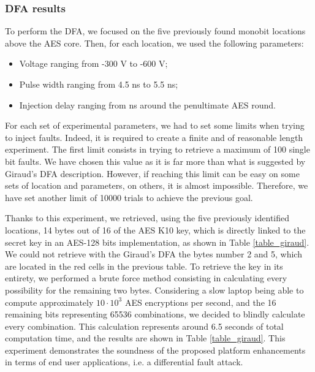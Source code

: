 		\subsubsection{DFA results}
			To perform the DFA, we focused on the five previously found monobit locations above the AES core.
			Then, for each location, we used the following parameters:
			\begin{itemize}
				\item Voltage ranging from -300 V to -600 V;
				\item Pulse width ranging from 4.5 ns to 5.5 ns;
				\item Injection delay ranging from  ns around the penultimate AES round.
			\end{itemize}
			For each set of experimental parameters, we had to set some limits when trying to inject faults.
			Indeed, it is required to create a finite and of reasonable length experiment.
			The first limit consists in trying to retrieve a maximum of 100 single bit faults.
			We have chosen this value as it is far more than what is suggested by Giraud's DFA \cite{giraudDfa} description.
			However, if reaching this limit can be easy on some sets of location and parameters, on others, it is almost impossible.
			Therefore, we have set another limit of 10000 trials to achieve the previous goal.
			
			Thanks to this experiment, we retrieved, using the five previously identified locations, 14 bytes out of 16 of the AES K10 key, which is directly linked to the secret key in an AES-128 bits implementation, as shown in Table \ref{table_giraud}.
			We could not retrieve with the Giraud's DFA the bytes number 2 and 5, which are located in the red cells in the previous table.
			To retrieve the key in its entirety, we performed a brute force method consisting in calculating every possibility for the remaining two bytes.
			Considering a slow laptop being able to compute approximately $10 \cdot 10^3$ AES encryptions per second, and the 16 remaining bits representing 65536 combinations, we decided to blindly calculate every combination.
			This calculation represents around 6.5 seconds of total computation time, and the results are shown in Table \ref{table_giraud}.
			This experiment demonstrates the soundness of the proposed platform enhancements in terms of end user applications, i.e. a differential fault attack.

